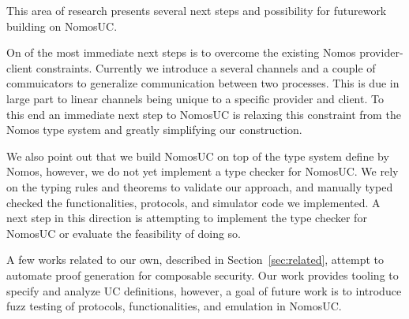This area of research presents several next steps and possibility for futurework building on NomosUC.

On of the most immediate next steps is to overcome the existing Nomos provider-client constraints. 
Currently we introduce a several channels and a couple of commuicators to generalize communication between two processes. 
This is due in large part to linear channels being unique to a specific provider and client.
To this end an immediate next step to NomosUC is relaxing this constraint from the Nomos type system and greatly simplifying our construction.

We also point out that we build NomosUC on top of the type system define by Nomos, however, we do not yet implement a type checker for NomosUC. We rely on the typing rules and theorems to validate our approach, and manually typed checked the functionalities, protocols, and simulator code we implemented.
A next step in this direction is attempting to implement the type checker for NomosUC or evaluate the feasibility of doing so.

A few works related to our own, described in Section~\ref{sec:related}, attempt to automate proof generation for composable security. Our work provides tooling to specify and analyze UC definitions, however, a goal of future work is to introduce fuzz testing of protocols, functionalities, and emulation in NomosUC.

